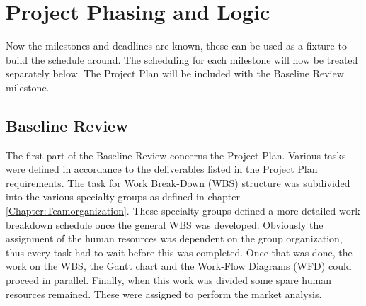 \documentclass[a4paper]{report}
\begin{document}
\section{Project Phasing and Logic}
Now the milestones and deadlines are known, these can be used as a fixture to build the schedule around. The scheduling for each milestone will now be treated separately below. The Project Plan will be included with the Baseline Review milestone. 
\subsection{Baseline Review}
The first part of the Baseline Review concerns the Project Plan. Various tasks were defined in accordance to the deliverables listed in the Project Plan requirements. The task for Work Break-Down (WBS) structure was subdivided into the various specialty groups as defined in chapter \ref{Chapter:Teamorganization}. These specialty groups defined a more detailed work breakdown schedule once the general WBS was developed. Obviously the assignment of the human resources was dependent on the group organization, thus every task had to wait before this was completed. Once that was done, the work on the WBS, the Gantt chart and the Work-Flow Diagrams (WFD) could proceed in parallel. Finally, when this work was divided some spare human resources remained. These were assigned to perform the market analysis. \newline
\end{document}
